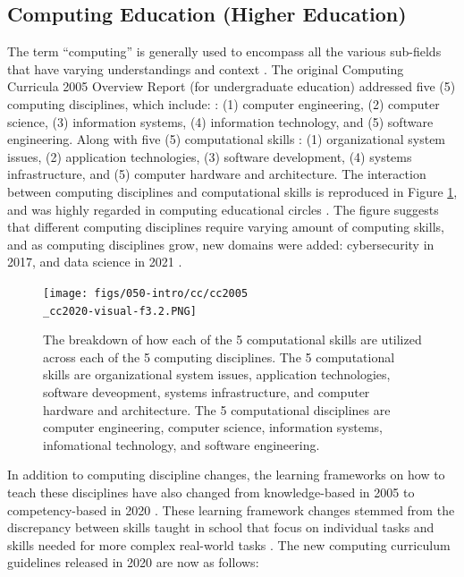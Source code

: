 \documentclass[010-intro.tex]{subfiles}
\begin{document}
\subsection{Computing Education (Higher Education)}

    The term ``computing'' is generally used to encompass all the various sub-fields that  have varying understandings and context
    \cite{cc2005, cc2020}.
    The original Computing Curricula 2005 Overview Report (for undergraduate education)
    addressed five (5) computing disciplines, which include: \cite{cc2005}:
    (1) computer engineering,
    (2) computer science,
    (3) information systems,
    (4) information technology, and
    (5) software engineering.
    Along with five (5) computational skills \cite{cc2005, cc2020}:
    (1) organizational system issues,
    (2) application technologies,
    (3) software development,
    (4) systems infrastructure, and
    (5) computer hardware and architecture.
    The interaction between computing disciplines and computational skills is reproduced in
    Figure \ref{fig:comp-disciplines-comp-skills},
    and was highly regarded in computing educational circles
    \cite{cc2005, cc2020}.
    The figure suggests that different computing disciplines require varying amount of computing skills,
    and as computing disciplines grow, new domains were added:
    cybersecurity in 2017, and
    data science in 2021
    \cite{ccdsc2021}.

    \begin{figure}[htb]
        \centering
        \texttt{[image: figs/050-intro/cc/cc2005\\\_cc2020-visual-f3.2.PNG]}
        \caption[Computational skills across computing disciplines]{
            The breakdown of how each of the 5 computational skills are utilized across each of the 5 computing disciplines.
            The 5 computational skills are
            organizational system issues, application technologies, software deveopment, systems infrastructure, and computer hardware and architecture.
            The 5 computational disciplines are
            computer engineering, computer science, information systems, infomational technology, and software engineering.
        }
        \label{fig:comp-disciplines-comp-skills}
    \end{figure}

    In addition to computing discipline changes,
    the learning frameworks on how to teach these disciplines have also changed
    from knowledge-based in 2005 to competency-based in 2020
    \cite{cc2020}.
    These learning framework changes stemmed from the discrepancy between
    skills taught in school that focus on individual tasks and skills needed for more complex real-world tasks
    \cite{cc2020}.
    The new computing curriculum guidelines released in 2020 are now as follows:
\end{document}
